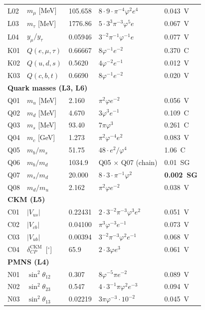 \documentclass[12pt,a4paper]{article}
\newcommand{\ph}{\varphi}
\begin{document}
\begin{longtable}{@{}lp{2.6cm}lp{4.6cm}l@{}}
L02 & $m_\mu$ [MeV] & 105.658 & $8{\cdot}9{\cdot}\pi^{-4}\ph^2 e^4$ & 0.043~V \\
L03 & $m_\tau$ [MeV] & 1776.86 & $5{\cdot}3^3\pi^{-3}\ph^5 e$ & 0.067~V \\
L04 & $y_\mu/y_\tau$ & 0.05946 & $3^{-2}\pi^{-1}\ph^{-1}e$ & 0.077~V \\
K01 & $Q(e,\mu,\tau)$ & 0.66667 & $8\ph^{-1}e^{-2}$ & 0.370~C \\
K02 & $Q(u,d,s)$ & 0.5620 & $4\ph^{-2}e^{-1}$ & 0.012~V \\
K03 & $Q(c,b,t)$ & 0.6690 & $8\ph^{-1}e^{-2}$ & 0.020~V \\
\midrule
\multicolumn{5}{l}{\textcolor{trinityOrange}{\textbf{Quark masses (L3, L6)}}}\\
Q01 & $m_u$ [MeV] & 2.160 & $\pi^2\ph e^{-2}$ & 0.056~V \\
Q02 & $m_d$ [MeV] & 4.670 & $3\ph^3 e^{-1}$ & 0.109~C \\
Q03 & $m_s$ [MeV] & 93.40 & $7\pi\ph^3$ & 0.261~C \\
Q04 & $m_c$ [GeV] & 1.273 & $\pi^2\ph^{-4}e^2$ & 0.083~V \\
Q05 & $m_b/m_s$ & 51.75 & $48\cdot e^2/\ph^4$ & 1.06~C \\
Q06 & $m_b/m_d$ & 1034.9 & Q05 $\times$ Q07 (chain) & 0.01~SG \\
Q07 & $m_s/m_d$ & 20.000 & $8{\cdot}3{\cdot}\pi^{-1}\ph^2$ & \textbf{0.002~SG} \\
Q08 & $m_d/m_u$ & 2.162 & $\pi^2\ph e^{-2}$ & 0.038~V \\
\midrule
\multicolumn{5}{l}{\textcolor{trinityRose}{\textbf{CKM (L5)}}}\\
C01 & $|V_{us}|$ & 0.22431 & $2{\cdot}3^{-2}\pi^{-3}\ph^3 e^2$ & 0.051~V \\
C02 & $|V_{cb}|$ & 0.04100 & $\pi^3\ph^{-3}e^{-1}$ & 0.073~V \\
C03 & $|V_{ub}|$ & 0.00394 & $3^{-2}\pi^{-3}\ph^2 e^{-1}$ & 0.068~V \\
C04 & $\delta_{CP}^{\mathrm{CKM}}$~[$^\circ$] & 65.9 & $2{\cdot}3\ph e^3$ & 0.061~V \\
\midrule
\multicolumn{5}{l}{\textcolor{trinityTeal}{\textbf{PMNS (L4)}}}\\
N01 & $\sin^2\theta_{12}$ & 0.307 & $8\ph^{-5}\pi e^{-2}$ & 0.089~V \\
N02 & $\sin^2\theta_{23}$ & 0.547 & $4{\cdot}3^{-1}\pi\ph^2 e^{-3}$ & 0.094~V \\
N03 & $\sin^2\theta_{13}$ & 0.02219 & $3\pi\ph^{-3}{\cdot}10^{-2}$ & 0.045~V \\

\end{longtable}
\end{document}
